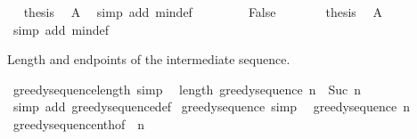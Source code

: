 \begin{isabellebody}
\ \isamarkupfalse%
\ {\isacharquery}{\kern0pt}thesis\ \isamarkupfalse%
\ A{}\ \isamarkupfalse%
\ {\isacharparenleft}{\kern0pt}simp\ add{\isacharcolon}{\kern0pt}\ min{\isacharunderscore}{\kern0pt}def{\isacharparenright}{\kern0pt}\isanewline
\ \ \isamarkupfalse%
\isanewline
\ \ \ \ \isamarkupfalse%
\ False\isanewline
\ \ \ \ \isamarkupfalse%
\ \isamarkupfalse%
\ {\isacharquery}{\kern0pt}thesis\ \isamarkupfalse%
\ A{}\ \isamarkupfalse%
\ {\isacharparenleft}{\kern0pt}simp\ add{\isacharcolon}{\kern0pt}\ min{\isacharunderscore}{\kern0pt}def{\isacharparenright}{\kern0pt}\isanewline
\ \ \isamarkupfalse%
\isanewline
{}\isamarkupfalse%
%
\endisatagproof
{\isafoldproof}%
%
\isadelimproof
%
\endisadelimproof
%
\begin{isamarkuptext}%
Length and endpoints of the intermediate sequence.%
\end{isamarkuptext}\isamarkuptrue%
\isamarkupfalse%
\ greedy{\isacharunderscore}{\kern0pt}sequence{\isacharunderscore}{\kern0pt}length\ {\isacharbrackleft}{\kern0pt}simp{\isacharbrackright}{\kern0pt}{\isacharcolon}{\kern0pt}\isanewline
\ \ {\isachardoublequoteopen}length\ {\isacharparenleft}{\kern0pt}greedy{\isacharunderscore}{\kern0pt}sequence\ n{\isacharparenright}{\kern0pt}\ {\isacharequal}{\kern0pt}\ Suc\ n{\isachardoublequoteclose}\isanewline
%
\isadelimproof
\ \ %
\endisadelimproof
%
\isatagproof
{}\isamarkupfalse%
\ {\isacharparenleft}{\kern0pt}simp\ add{\isacharcolon}{\kern0pt}\ greedy{\isacharunderscore}{\kern0pt}sequence{\isacharunderscore}{\kern0pt}def{\isacharparenright}{\kern0pt}%
\endisatagproof
{\isafoldproof}%
%
\isadelimproof
\isanewline
%
\endisadelimproof
\isanewline
{}\isamarkupfalse%
\ greedy{\isacharunderscore}{\kern0pt}sequence{\isacharunderscore}{\kern0pt}{}\ {\isacharbrackleft}{\kern0pt}simp{\isacharbrackright}{\kern0pt}{\isacharcolon}{\kern0pt}\isanewline
\ \ {\isachardoublequoteopen}greedy{\isacharunderscore}{\kern0pt}sequence\ n\ {\isacharbang}{\kern0pt}\ {}\ {\isacharequal}{\kern0pt}\ {\isacharbraceleft}{\kern0pt}{\isacharbraceright}{\kern0pt}{\isachardoublequoteclose}\isanewline
%
\isadelimproof
\ \ %
\endisadelimproof
%
\isatagproof
{}\isamarkupfalse%
\ greedy{\isacharunderscore}{\kern0pt}sequence{\isacharunderscore}{\kern0pt}nth{\isacharbrackleft}{\kern0pt}of\ {}\ n{\isacharbrackright}{\kern0pt}\ \isamarkupfalse%

\end{isabellebody}
